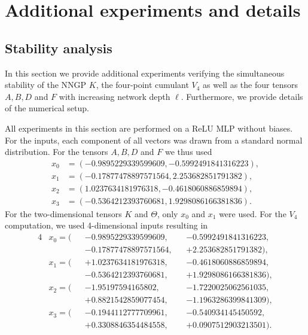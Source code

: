 \section{Additional experiments and details}
\label{app:experiments}


\subsection{Stability analysis}

In this section we provide additional experiments verifying the simultaneous stability of the NNGP $K$, the four-point cumulant $V_4$ as well as the four tensors $A, B, D$ and $F$ with increasing network depth $\ell$. Furthermore, we provide details of the numerical setup.

All experiments in this section are performed on a ReLU MLP without biases.
For the inputs, each component of all  vectors was drawn from a standard normal distribution. For the tensors $A, B, D$ and $F$ we thus used
\begin{align}
  x_0 &= ( -0.9895229339599609, -0.5992491841316223), \label{eq:x0_input} \\
  x_1 &= (-0.17877478897571564, 2.253682851791382), \label{eq:x1_input} \\
  x_2 &= (1.0237634181976318, -0.4618060886859894), \label{eq:x2_input} \\
  x_3 &= (-0.5364212393760681, 1.9298086166381836) \label{eq:x3_input}.
\end{align}
For the two-dimensional tensors $K$ and $\Theta$, only $x_0$ and $x_1$ were used. For the $V_4$ computation, we used 4-dimensional inputs resulting in
\begin{alignat}{4}
  &x_0 = ( && -0.9895229339599609, && -0.5992491841316223, \nonumber \\
  & && -0.17877478897571564, && +2.253682851791382), \\
  &x_1 = (&& +1.0237634181976318, && -0.4618060886859894, \nonumber \\
  & && -0.5364212393760681, && +1.9298086166381836), \\
  &x_2 = (&& -1.95197594165802, && -1.7220025062561035, \nonumber \\
  & && +0.8821542859077454, && -1.1963286399841309), \\
  &x_3 = (&& -0.1944112777709961, && -0.540934145450592, \nonumber \\ 
  & && +0.3308846354484558, && +0.0907512903213501).
\end{alignat}

